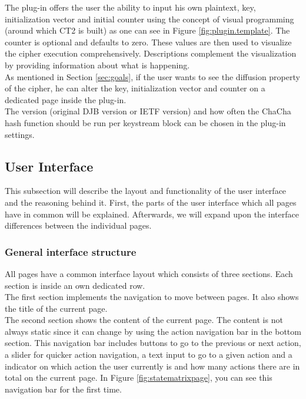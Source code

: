 The plug-in offers the user the ability to input his own plaintext, key, initialization vector and initial counter using the concept of visual programming (around which CT2 is built) as one can see in Figure \ref{fig:plugin.template}. The counter is optional and defaults to zero. These values are then used to visualize the cipher execution comprehensively. Descriptions complement the visualization by providing information about what is happening. \\
As mentioned in Section \ref{sec:goals}, if the user wants to see the diffusion property of the cipher, he can alter the key, initialization vector and counter on a dedicated page inside the plug-in. \\
The version (original DJB version or IETF version) and how often the ChaCha hash function should be run per keystream block can be chosen in the plug-in settings.

\subsection{User Interface}
\label{sec:userInterface}

This subsection will describe the layout and functionality of the user interface and the reasoning behind it. First, the parts of the user interface which all pages have in common will be explained. Afterwards, we will expand upon the interface differences between the individual pages.

\subsubsection{General interface structure}

All pages have a common interface layout which consists of three sections. Each section is inside an own dedicated row.\\
The first section implements the navigation to move between pages. It also shows the title of the current page.\\
The second section shows the content of the current page. The content is not always static since it can change by using the action navigation bar in the bottom section. This navigation bar includes buttons to go to the previous or next action, a slider for quicker action navigation, a text input to go to a given action and a indicator on which action the user currently is and how many actions there are in total on the current page. In Figure \ref{fig:statematrixpage}, you can see this navigation bar for the first time.

